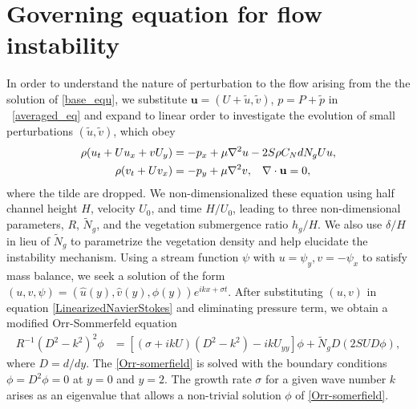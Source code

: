\documentclass[12pt]{report}   %
\newcommand{\bu}{\mathbf{u}}
\newcommand{\hg}{h_g}
\newcommand{\Rey}{{R}}
\newcommand{\Ndg}{\tilde{N}_g}
\begin{document}
\section{Governing equation for flow instability}
 In order to understand the nature of perturbation to the flow arising from the the solution of \ref{base_equ}, we substitute $\bu = (U+\tilde{u}, \tilde{v})$, $p=P+\tilde{p}$ in ~\eqref{averaged_eq} and expand to linear order to investigate the evolution of small perturbations $(\tilde{u}, \tilde{v})$, which obey
\begin{equation}
\begin{split}
\rho(u_t+U u_x+vU_y) &= -p_x+ {\mu}\nabla^2u-2S\rho C_{N}dN_{g}Uu, \\
\rho(v_t+ Uv_x) &= -p_y+ {\mu}\nabla^2v, \hspace{0.3cm} \nabla\cdot\bu=0,
\label{LinearizedNavierStokes}
\end{split} 
\end{equation}
where the tilde are dropped.
We non-dimensionalized these equation using half channel height $H$, velocity $U_0$, and time $H/U_0$, leading to three non-dimensional parameters, $\Rey$, $\Ndg$, and the vegetation submergence ratio $\hg/H$. 
We also use $\delta/H$ in lieu of $\Ndg$ to parametrize the vegetation density and help elucidate the instability mechanism. 
Using a stream function $\psi$ with $u = \psi_{y}, v= -\psi_x$ to satisfy mass balance, we seek a solution of 
the form $\left(u,v,\psi \right)= \left(\hat u(y), \hat v(y), \phi(y) \right)e^{ikx+\sigma t}$. After substituting $(u,v)$ in equation \ref{LinearizedNavierStokes} and eliminating pressure term, we obtain a modified Orr-Sommerfeld equation \cite{Drazin81,Chen97,Chu91} 
\begin{equation}
\begin{split}
\Rey^{-1}\left(D^2 -k^{2} \right)^2\phi &= \left[ \left({\sigma}+ikU\right) \left(D^2-k^2\right) -ikU_{yy}\right]\phi + \Ndg D\left(2 S U D \phi\right),
\label{Orr-somerfield}
\end{split}
\end{equation}
where $D=d/dy$. The \ref{Orr-somerfield} is solved with the boundary conditions $\phi = D^2\phi = 0$ at $y=0$ and $y=2$. 
The growth rate $\sigma$ for a given wave number $k$ arises as an eigenvalue that allows a non-trivial solution $\phi$ of  \eqref{Orr-somerfield}.
\end{document}
